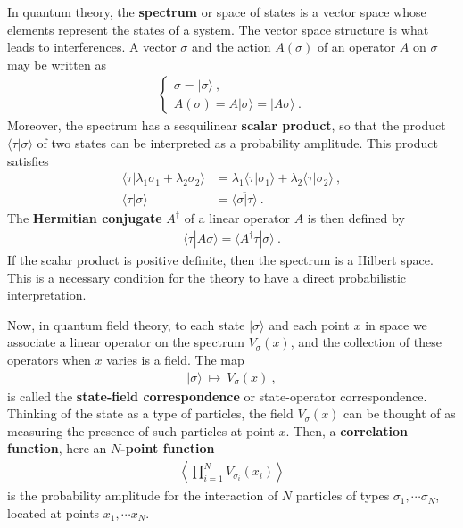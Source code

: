 \documentclass[12pt,a4paper,notitlepage]{report}
\newcommand \la {\left\langle}
\newcommand \ra {\right\rangle}
\newcommand \bla {\left\{\begin{array}{l} }
\newcommand \ela {\end{array}\right. }
\numberwithin{equation}{section}
\theoremstyle{break}
\begin{document}
In quantum theory, the \textbf{\boldmath spectrum} or space of states is a vector space whose elements represent the states of a system. The vector space structure is what leads to interferences. A vector $\sigma$ and the action $A(\sigma)$ of an operator $A$ on $\sigma$ may be written as 
\begin{align}
\bla
 \sigma = |\sigma\rangle\ , \\ A(\sigma) = A|\sigma\rangle = |A\sigma\rangle\ .
\ela
\end{align}
Moreover, the spectrum has a sesquilinear \textbf{\boldmath scalar product}, so that the product $\langle \tau|\sigma \rangle$ of two states can be interpreted as a probability amplitude. This product satisfies
\begin{align}
\langle \tau| \lambda_1\sigma_1+\lambda_2\sigma_2\rangle &= \lambda_1 \langle \tau|\sigma_1\rangle + \lambda_2\langle \tau|\sigma_2\rangle\ ,
\\
\langle \tau|\sigma \rangle &= \overline{\langle \sigma|\tau\rangle}\ .
\end{align}
The \textbf{\boldmath Hermitian conjugate} $A^\dagger$ of a linear operator $A$ is then defined by
\begin{align}
 \langle \tau | A \sigma\rangle = \langle A^\dagger \tau | \sigma\rangle\ .
\label{lld}
\end{align}
If the scalar product is positive definite, then the spectrum is a Hilbert space. This is a necessary condition for the theory to have a direct probabilistic interpretation.

Now, in quantum field theory, to each state $|\sigma\rangle$ and each point $x$ in space we associate a linear operator on the spectrum $V_\sigma(x)$, and the collection of these operators when $x$ varies is a field. 
The map 
\begin{align}
 |\sigma \rangle  \ \mapsto \ V_\sigma(x)\ ,
\end{align}
is called the \textbf{\boldmath state-field correspondence} or state-operator correspondence.
Thinking of the state as a type of particles, the field $V_\sigma(x)$ can be thought of as measuring the presence of such particles at point $x$. Then, a \textbf{\boldmath correlation function}, here an \textbf{\boldmath $N$-point function}
\begin{align}
\la \prod_{i=1}^N V_{\sigma_i}(x_i)\ra
\label{pva}
\end{align}
is the probability amplitude for the interaction of $N$ particles of types $\sigma_1,\cdots \sigma_N$, located at points $x_1,\cdots x_N$. 
\end{document}
